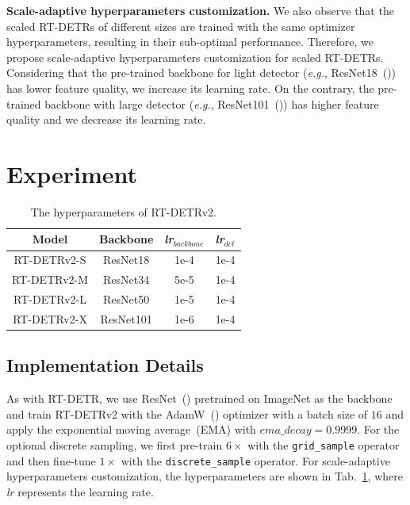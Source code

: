 \documentclass{article}
\begin{document}
\noindent \textbf{Scale-adaptive hyperparameters customization.}
We also observe that the scaled RT-DETRs of different sizes are trained with the same optimizer hyperparameters, resulting in their sub-optimal performance.
Therefore, we propose scale-adaptive hyperparameters customization for scaled RT-DETRs.
Considering that the pre-trained backbone for light detector (\textit{e.g.}, ResNet18~(\cite{he2016deep})) has lower feature quality, we increase its learning rate. On the contrary, the pre-trained backbone with large detector (\textit{e.g.}, ResNet101~(\cite{he2016deep})) has higher feature quality and we decrease its learning rate.


\section{Experiment}
\begin{table}
\vspace{-6.5mm}
\caption{The hyperparameters of RT-DETRv2.}
\vspace{1mm}
\label{tab:hyper}
\centering
\renewcommand{\arraystretch}{1.15}
\setlength{\tabcolsep}{5.33pt}
\begin{tabular}{cccc}
  \toprule
   \textbf{Model} & \textbf{Backbone} & \textit{lr$_{backbone}$} & \textit{lr$_{det}$} \\ 
  \midrule
  \midrule
  RT-DETRv2-S & ResNet18 & 1e-4 & 1e-4 \\
  RT-DETRv2-M & ResNet34 & 5e-5 & 1e-4 \\
  RT-DETRv2-L & ResNet50 & 1e-5 & 1e-4 \\
  RT-DETRv2-X & ResNet101 & 1e-6 & 1e-4 \\
  \bottomrule
\end{tabular}
\end{table}
\subsection{Implementation Details}
As with RT-DETR, we use ResNet~(\cite{he2016deep}) pretrained on ImageNet as the backbone and train RT-DETRv2 with the AdamW~(\cite{loshchilov2018decoupled}) optimizer with a batch size of $16$ and apply the exponential moving average~(EMA) with $ema\_decay=0.9999$.
For the optional discrete sampling, we first pre-train $6\times$ with the \texttt{grid\_sample} operator and then fine-tune $1\times$ with the \texttt{discrete\_sample} operator.
For scale-adaptive hyperparameters customization, the hyperparameters are shown in Tab.~\ref{tab:hyper}, where \textit{lr} represents the learning rate.
\end{document}

